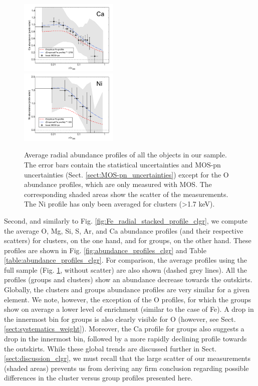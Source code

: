 \documentclass{aa}
\begin{document}
\begin{figure}[!]
                \includegraphics[width=0.42\textwidth]{fig_radial_stacked_Ca.pdf}
\\
                \includegraphics[width=0.42\textwidth]{fig_radial_stacked_Ni.pdf}

        \caption{Average radial abundance profiles of all the objects in our sample. The error bars contain the statistical uncertainties and MOS-pn uncertainties (Sect. \ref{sect:MOS-pn_uncertainties}) except for the O abundance profiles, which are only measured with MOS. The corresponding shaded areas show the scatter of the measurements. The Ni profile has only been averaged for clusters (>1.7 keV).}
\label{fig:abundance_profiles}
\end{figure}





Second, and similarly to Fig. \ref{fig:Fe_radial_stacked_profile_clgr}, we compute the average O, Mg, Si, S, Ar, and Ca abundance profiles (and their respective scatters) for clusters, on the one hand, and for groups, on the other hand. These profiles are shown in Fig. \ref{fig:abundance_profiles_clgr} and Table \ref{table:abundance_profiles_clgr}. For comparison, the average profiles using the full sample (Fig. \ref{fig:abundance_profiles}, without scatter) are also shown (dashed grey lines). All the profiles (groups and clusters) show an abundance decrease towards the outskirts. Globally, the clusters and groups abundance profiles are very similar for a given element. We note, however, the exception of the O profiles, for which the groups show on average a lower level of enrichment (similar to the case of Fe). A drop in the innermost bin for groups is also clearly visible for O (however, see Sect. \ref{sect:systematics_weight}). Moreover, the Ca profile for groups also suggests a drop in the innermost bin, followed by a more rapidly declining profile towards the outskirts. While these global trends are discussed further in Sect. \ref{sect:discussion_clgr}, we must recall that the large scatter of our measurements (shaded areas) prevents us from deriving any firm conclusion regarding possible differences in the cluster versus group profiles presented here.
\end{document}
